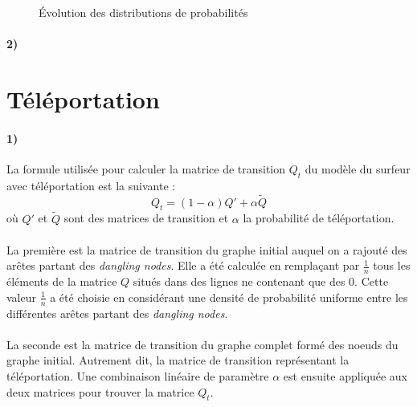 \documentclass[a4paper,titlepage]{report}
\begin{document}
\begin{figure}[h]
	\caption{Évolution des distributions de probabilités}
	\label{fig:q118}
\end{figure}
\paragraph{2)} 
\section{Téléportation}
\paragraph{1)}
La formule utilisée pour calculer la matrice de transition $Q_t$ du modèle du surfeur avec téléportation est la suivante :
\[
	Q_t = (1 - \alpha) Q' + \alpha \tilde{Q}
\]
où $Q'$ et $\tilde{Q}$ sont des matrices de transition et $\alpha$ la probabilité de téléportation. 
\paragraph{}
La première est la matrice de transition du graphe initial auquel on a rajouté des arêtes partant des \textit{dangling nodes}. Elle a été calculée en remplaçant par $\frac{1}{n}$ tous les éléments de la matrice $Q$ situés dans des lignes ne contenant que des 0. Cette valeur $\frac{1}{n}$ a été choisie en considérant une densité de probabilité uniforme entre les différentes arêtes partant des \textit{dangling nodes}. 
\paragraph{}
La seconde est la matrice de transition du graphe complet formé des noeuds du graphe initial. Autrement dit, la matrice de transition représentant la téléportation. Une combinaison linéaire de paramètre $\alpha$ est ensuite appliquée aux deux matrices pour trouver la matrice $Q_t$.
\end{document}
